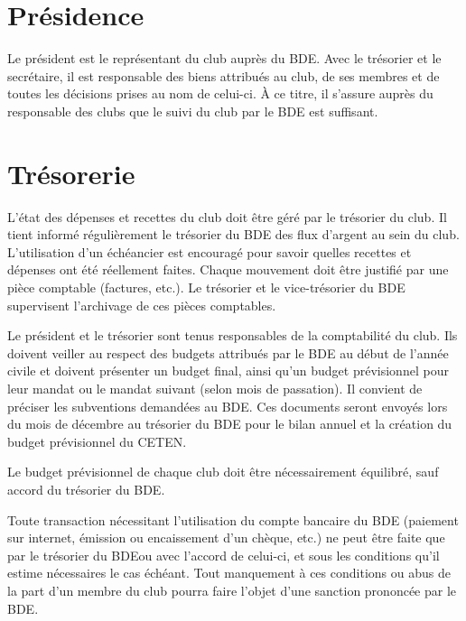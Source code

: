 \documentclass{article}
\begin{document}
\begin{multicols}{2}
{		}

		\section{Présidence}
\label{sec:presidence}

		{\small

			Le président est le représentant du club auprès du BDE\@. Avec le
			trésorier et le secrétaire, il est responsable des biens attribués
			au club, de ses membres et de toutes les décisions prises au nom de
			celui-ci. À ce titre, il s'assure auprès du responsable des clubs
			que le suivi du club par le BDE est suffisant. 

		}

		\section{Trésorerie}
\label{sec:tresorerie}

		{\small
		
			L’état des dépenses et recettes du club doit être géré par le
			trésorier du club. Il tient informé régulièrement le trésorier du
			BDE des flux d’argent au sein du club. L’utilisation d’un échéancier
			est encouragé pour savoir quelles recettes et dépenses ont été
			réellement faites. Chaque mouvement doit être justifié par une pièce
			comptable (factures, etc.). Le trésorier et le vice-trésorier du BDE
			supervisent l'archivage de ces pièces comptables.

			Le président et le trésorier sont tenus responsables de la
			comptabilité du club. Ils doivent veiller au respect des budgets
			attribués par le BDE au début de l’année civile et doivent présenter
			un budget final, ainsi qu’un budget prévisionnel pour leur mandat ou
			le mandat suivant (selon mois de passation). Il convient de préciser
			les subventions demandées au BDE\@. Ces documents seront envoyés
			lors du mois de décembre au trésorier du BDE pour le bilan annuel et
			la création du budget prévisionnel du CETEN\@.

			Le budget prévisionnel de chaque club doit être nécessairement
			équilibré, sauf accord du trésorier du BDE\@.

			Toute transaction nécessitant l’utilisation du compte bancaire du
			BDE (paiement sur internet, émission ou encaissement d’un chèque,
			etc.) ne peut être faite que par le trésorier du BDE\@ ou avec
			l'accord de celui-ci, et sous les conditions qu'il estime
			nécessaires le cas échéant. Tout manquement à ces conditions ou abus
			de la part d'un membre du club pourra faire l'objet d'une sanction
			prononcée par le BDE\@.

}
\end{multicols}
\end{document}
